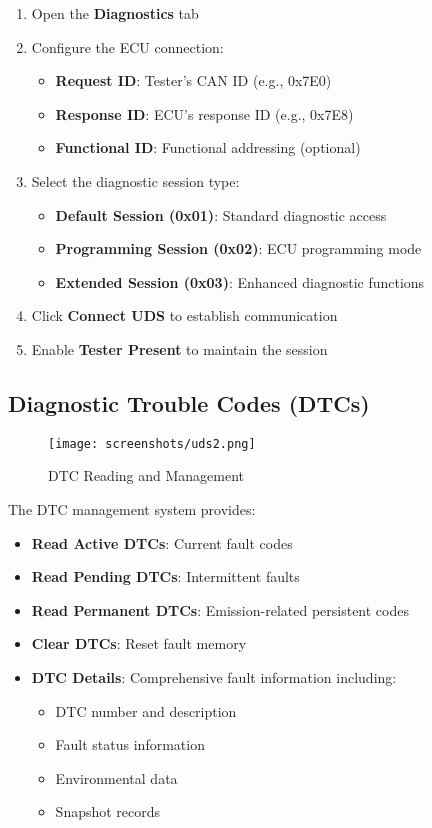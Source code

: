 \documentclass[11pt,a4paper]{article}
\begin{document}
\begin{enumerate}
    \item Open the \textbf{Diagnostics} tab
    \item Configure the ECU connection:
    \begin{itemize}
        \item \textbf{Request ID}: Tester's CAN ID (e.g., 0x7E0)
        \item \textbf{Response ID}: ECU's response ID (e.g., 0x7E8)
        \item \textbf{Functional ID}: Functional addressing (optional)
    \end{itemize}
    \item Select the diagnostic session type:
    \begin{itemize}
        \item \textbf{Default Session (0x01)}: Standard diagnostic access
        \item \textbf{Programming Session (0x02)}: ECU programming mode
        \item \textbf{Extended Session (0x03)}: Enhanced diagnostic functions
    \end{itemize}
    \item Click \textbf{Connect UDS} to establish communication
    \item Enable \textbf{Tester Present} to maintain the session
\end{enumerate}

\subsection{Diagnostic Trouble Codes (DTCs)}

\begin{figure}[H]
    \centering
    \texttt{[image: screenshots/uds2.png]}
    \caption{DTC Reading and Management}
    \label{fig:uds2}
\end{figure}

The DTC management system provides:

\begin{itemize}
    \item \textbf{Read Active DTCs}: Current fault codes
    \item \textbf{Read Pending DTCs}: Intermittent faults
    \item \textbf{Read Permanent DTCs}: Emission-related persistent codes
    \item \textbf{Clear DTCs}: Reset fault memory
    \item \textbf{DTC Details}: Comprehensive fault information including:
    \begin{itemize}
        \item DTC number and description
        \item Fault status information
        \item Environmental data
        \item Snapshot records
    \end{itemize}
\end{itemize}
\end{document}
